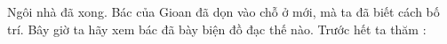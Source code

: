 %
%
%
%
%
%

\VUsaut{6.0mm}
\VUsaut{1.4mm}
\VUsaut{0.4mm}
\VUsaut{2.2mm}

Ngôi nhà đã xong. Bác của Gioan đã dọn vào chỗ ở mới, mà ta đã biết cách bố trí. Bây giờ
ta hãy xem bác đã bày biện đồ đạc thế nào. Trước hết ta thăm :

